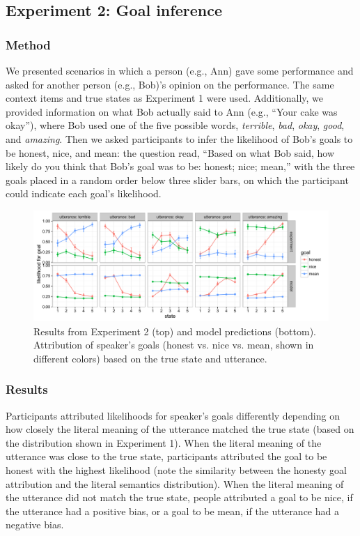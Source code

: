 \documentclass[10pt,letterpaper]{article}
\begin{document}
\subsection{Experiment 2: Goal inference}

\subsubsection{Method} 

We presented scenarios in which a person (e.g., Ann) gave some performance and asked for another person (e.g., Bob)'s opinion on the performance. The same context items and true states as Experiment 1 were used. Additionally, we provided information on what Bob actually said to Ann (e.g., ``Your cake was okay''), where Bob used one of the five possible words,  \emph{terrible}, \emph{bad}, \emph{okay}, \emph{good}, and \emph{amazing}. Then we asked participants to infer the likelihood of Bob's goals to be honest, nice, and mean: the question read, ``Based on what Bob said, how likely do you think that Bob's goal was to be: honest; nice; mean,'' with the three goals placed in a random order below three slider bars, on which the participant could indicate each goal's likelihood.

\begin{figure}[t]
\begin{center} 
  \includegraphics[width=.9\textwidth]{figures/exp2.pdf}
  \caption{\label{fig:exp2} Results from Experiment 2 (top) and model predictions (bottom). Attribution of speaker's goals (honest vs. nice vs. mean, shown in different colors) based on the true state and utterance.}
  \end{center} 
\end{figure}


\subsubsection{Results}

Participants attributed likelihoods for speaker's goals differently depending on how closely the literal meaning of the utterance matched the true state (based on the distribution shown in Experiment 1). When the literal meaning of the utterance was close to the true state, participants attributed the goal to be honest with the highest likelihood (note the similarity between the honesty goal attribution and the literal semantics distribution). When the literal meaning of the utterance did not match the true state, people attributed a goal to be nice, if the utterance had a positive bias, or a goal to be mean, if the utterance had a negative bias.
\end{document}
